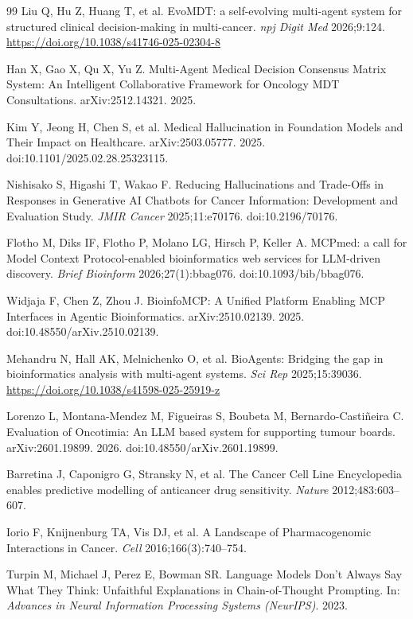 \documentclass[11pt,letterpaper]{article}
\begin{document}
\begin{thebibliography}{99}
Liu Q, Hu Z, Huang T, et al.
EvoMDT: a self-evolving multi-agent system for structured clinical decision-making in multi-cancer.
\textit{npj Digit Med} 2026;9:124.
\url{https://doi.org/10.1038/s41746-025-02304-8}

Han X, Gao X, Qu X, Yu Z.
Multi-Agent Medical Decision Consensus Matrix System: An Intelligent Collaborative Framework for Oncology MDT Consultations.
arXiv:2512.14321. 2025.

Kim Y, Jeong H, Chen S, et al.
Medical Hallucination in Foundation Models and Their Impact on Healthcare.
arXiv:2503.05777. 2025.
doi:10.1101/2025.02.28.25323115.

Nishisako S, Higashi T, Wakao F.
Reducing Hallucinations and Trade-Offs in Responses in Generative AI Chatbots for Cancer Information: Development and Evaluation Study.
\textit{JMIR Cancer} 2025;11:e70176.
doi:10.2196/70176.

Flotho M, Diks IF, Flotho P, Molano LG, Hirsch P, Keller A.
MCPmed: a call for Model Context Protocol-enabled bioinformatics web services for LLM-driven discovery.
\textit{Brief Bioinform} 2026;27(1):bbag076.
doi:10.1093/bib/bbag076.

Widjaja F, Chen Z, Zhou J.
BioinfoMCP: A Unified Platform Enabling MCP Interfaces in Agentic Bioinformatics.
arXiv:2510.02139. 2025.
doi:10.48550/arXiv.2510.02139.

Mehandru N, Hall AK, Melnichenko O, et al.
BioAgents: Bridging the gap in bioinformatics analysis with multi-agent systems.
\textit{Sci Rep} 2025;15:39036.
\url{https://doi.org/10.1038/s41598-025-25919-z}

Lorenzo L, Montana-Mendez M, Figueiras S, Boubeta M, Bernardo-Casti\~{n}eira C.
Evaluation of Oncotimia: An LLM based system for supporting tumour boards.
arXiv:2601.19899. 2026.
doi:10.48550/arXiv.2601.19899.

Barretina J, Caponigro G, Stransky N, et al.
The Cancer Cell Line Encyclopedia enables predictive modelling of anticancer drug sensitivity.
\textit{Nature} 2012;483:603--607.

Iorio F, Knijnenburg TA, Vis DJ, et al.
A Landscape of Pharmacogenomic Interactions in Cancer.
\textit{Cell} 2016;166(3):740--754.

Turpin M, Michael J, Perez E, Bowman SR.
Language Models Don't Always Say What They Think: Unfaithful Explanations in Chain-of-Thought Prompting.
In: \textit{Advances in Neural Information Processing Systems (NeurIPS)}. 2023.


\end{thebibliography}
\end{document}
